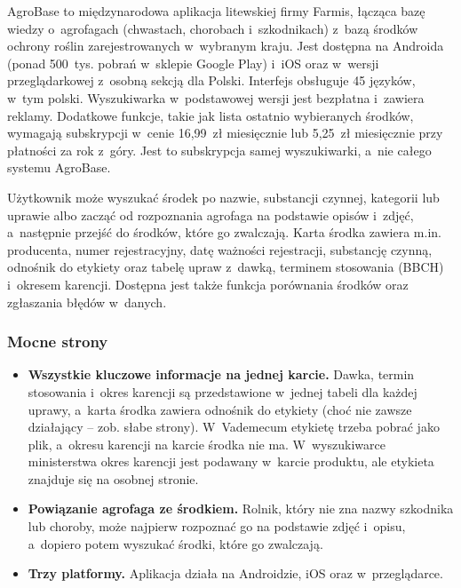 AgroBase to międzynarodowa aplikacja litewskiej firmy Farmis, łącząca bazę
wiedzy o~agrofagach (chwastach, chorobach i~szkodnikach) z~bazą środków
ochrony roślin zarejestrowanych w~wybranym kraju. Jest dostępna na Androida
(ponad 500~tys. pobrań w~sklepie Google Play) i~iOS oraz w~wersji
przeglądarkowej z~osobną sekcją dla Polski. Interfejs obsługuje 45 języków,
w~tym polski. Wyszukiwarka w~podstawowej wersji jest bezpłatna i~zawiera
reklamy. Dodatkowe funkcje, takie jak lista ostatnio wybieranych środków,
wymagają subskrypcji w~cenie 16,99~zł miesięcznie lub 5,25~zł miesięcznie
przy płatności za rok z~góry. Jest to subskrypcja samej wyszukiwarki, a~nie
całego systemu AgroBase.

Użytkownik może wyszukać środek po nazwie, substancji czynnej, kategorii
lub uprawie albo zacząć od rozpoznania agrofaga na podstawie opisów
i~zdjęć, a~następnie przejść do środków, które go zwalczają. Karta środka
zawiera m.in. producenta, numer rejestracyjny, datę ważności rejestracji,
substancję czynną, odnośnik do etykiety oraz tabelę upraw z~dawką,
terminem stosowania (BBCH) i~okresem karencji. Dostępna jest także funkcja
porównania środków oraz zgłaszania błędów w~danych.

\subsubsection{Mocne strony}

\begin{itemize}
    \item \textbf{Wszystkie kluczowe informacje na jednej karcie.}
    Dawka, termin stosowania i~okres karencji są przedstawione w~jednej
    tabeli dla każdej uprawy, a~karta środka zawiera odnośnik do etykiety
    (choć nie zawsze działający -- zob. słabe strony). W~Vademecum etykietę
    trzeba pobrać jako plik, a~okresu karencji na karcie środka nie ma.
    W~wyszukiwarce ministerstwa okres karencji jest podawany w~karcie
    produktu, ale etykieta znajduje się na osobnej stronie.

    \item \textbf{Powiązanie agrofaga ze środkiem.}
    Rolnik, który nie zna nazwy szkodnika lub choroby, może najpierw
    rozpoznać go na podstawie zdjęć i~opisu, a~dopiero potem wyszukać
    środki, które go zwalczają.

    \item \textbf{Trzy platformy.}
    Aplikacja działa na Androidzie, iOS oraz w~przeglądarce.
\end{itemize}

